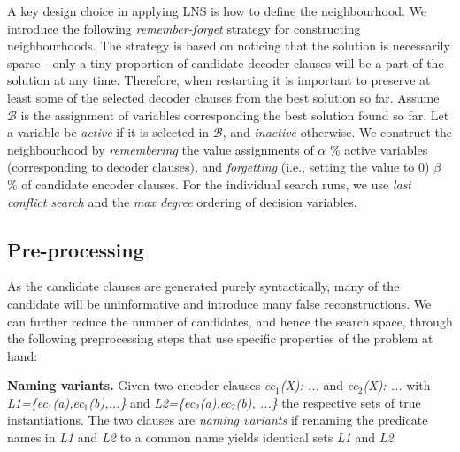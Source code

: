 A key design choice in applying LNS is how to define the neighbourhood.
We introduce the following \textit{remember-forget} strategy for constructing neighbourhoods.
The strategy is based on noticing that the solution is necessarily sparse - only a tiny proportion of candidate decoder clauses will be a part of the solution at any time.
Therefore, when restarting it is important to preserve at least some of the selected decoder clauses from the best solution so far. 
Assume $\mathcal{B}$ is the assignment of variables corresponding the best solution found so far.
Let a variable be \textit{active} if it is selected in $\mathcal{B}$, and \textit{inactive} otherwise.
We construct the neighbourhood by \textit{remembering} the value assignments of $\alpha$ \% active variables (corresponding to decoder clauses), and \textit{forgetting} (i.e., setting the value to 0) $\beta$ \% of candidate encoder clauses.
For the individual search runs, we use \textit{last conflict search} \cite{COS} and the \textit{max degree} ordering of decision variables.




\subsection{Pre-processing}
As the candidate clauses are generated purely syntactically, many of the candidate will be uninformative and introduce many false reconstructions.
We can further reduce the number of candidates, and hence the search space, through the following preprocessing steps that use specific properties of the problem at hand:

\begin{definition}
\textbf{Naming variants.}
Given two encoder clauses \textit{ec$_1$(X):\!-...}
and \textit{ec$_2$(X):\!-...}
with \textit{L1=\{ec$_1$(a),ec$_1$(b),...\}} and \textit{L2=\{ec$_2$(a),ec$_2$(b), ...\}} the respective sets of true instantiations. 
The two clauses are \textit{naming variants} if renaming the predicate names in \textit{L1} and \textit{L2} to a common name yields identical sets \textit{L1} and \textit{L2}.
\end{definition}

